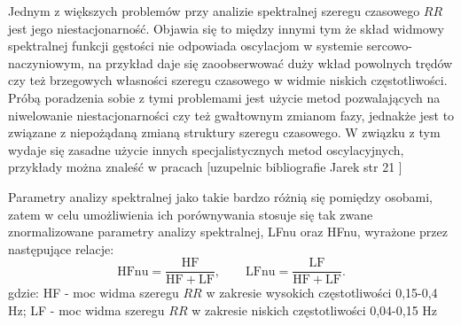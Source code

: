 Jednym z większych problemów przy analizie spektralnej szeregu czasowego $RR$ jest jego
niestacjonarność. Objawia się to między innymi tym że skład widmowy spektralnej funkcji
gęstości nie odpowiada oscylacjom w systemie sercowo-naczyniowym, na przykład daje się
zaoobserwować duży wkład powolnych trędów czy też brzegowych własności szeregu czasowego
w widmie niskich częstotliwości. Próbą poradzenia sobie z tymi problemami jest użycie metod
pozwalających na niwelowanie niestacjonarności czy też gwałtownym zmianom fazy, jednakże
jest to związane z niepożądaną zmianą struktury szeregu czasowego. W związku z tym wydaje
się zasadne użycie innych specjalistycznych metod oscylacyjnych, przykłady można znaleść
w pracach [uzupelnic bibliografie Jarek str 21 ]     
 
Parametry analizy spektralnej jako takie bardzo różnią się pomiędzy osobami, zatem w celu
umożliwienia ich porównywania stosuje się tak zwane znormalizowane parametry analizy
spektralnej, LFnu oraz HFnu, wyrażone przez następujące relacje:
\begin{equation}
\mathrm{HFnu=\frac{HF}{HF+LF}},\qquad \mathrm{LFnu=\frac{LF}{HF+LF}}. \label{HFLFnu}
\end{equation}
gdzie: HF - moc widma szeregu $RR$ w zakresie wysokich częstotliwości 0,15-0,4 Hz;
LF - moc widma szeregu $RR$ w zakresie niskich częstotliwości 0,04-0,15 Hz



